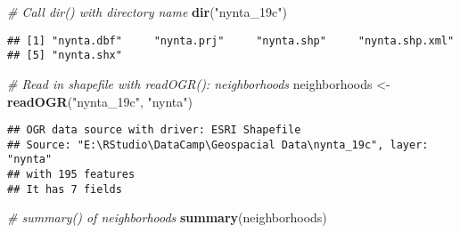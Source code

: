 \documentclass[]{article}
\newenvironment{Shaded}{\begin{snugshade}}{\end{snugshade}}
\newcommand{\CommentTok}[1]{\textcolor[rgb]{0.56,0.35,0.01}{\textit{#1}}}
\newcommand{\KeywordTok}[1]{\textcolor[rgb]{0.13,0.29,0.53}{\textbf{#1}}}
\newcommand{\NormalTok}[1]{#1}
\newcommand{\StringTok}[1]{\textcolor[rgb]{0.31,0.60,0.02}{#1}}
\begin{document}
\begin{Shaded}
\begin{Highlighting}[]
\CommentTok{# Call dir() with directory name}
\KeywordTok{dir}\NormalTok{(}\StringTok{"nynta_19c"}\NormalTok{)}
\end{Highlighting}
\end{Shaded}

\begin{verbatim}
## [1] "nynta.dbf"     "nynta.prj"     "nynta.shp"     "nynta.shp.xml"
## [5] "nynta.shx"
\end{verbatim}

\begin{Shaded}
\begin{Highlighting}[]
\CommentTok{# Read in shapefile with readOGR(): neighborhoods}
\NormalTok{neighborhoods <-}\StringTok{ }\KeywordTok{readOGR}\NormalTok{(}\StringTok{"nynta_19c"}\NormalTok{, }\StringTok{"nynta"}\NormalTok{)}
\end{Highlighting}
\end{Shaded}

\begin{verbatim}
## OGR data source with driver: ESRI Shapefile 
## Source: "E:\RStudio\DataCamp\Geospacial Data\nynta_19c", layer: "nynta"
## with 195 features
## It has 7 fields
\end{verbatim}

\begin{Shaded}
\begin{Highlighting}[]
\CommentTok{# summary() of neighborhoods}
\KeywordTok{summary}\NormalTok{(neighborhoods)}
\end{Highlighting}
\end{Shaded}
\end{document}
